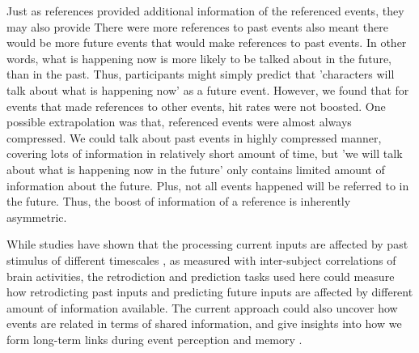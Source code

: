 Just as references provided additional information of the referenced events, they may also provide 
There were more references to past events also meant there would be more future events that would make references to past events. In other words, what is happening now is more likely to be talked about in the future, than in the past. Thus, participants might simply predict that 'characters will talk about what is happening now' as a future event. However, we found that for events that made references to other events, hit rates were not boosted. One possible extrapolation was that, referenced events were almost always compressed. We could talk about past events in highly compressed manner, covering lots of information in relatively short amount of time, but 'we will talk about what is happening now in the future' only contains limited amount of information about the future. Plus, not all events happened will be referred to in the future. Thus, the boost of information of a reference is inherently asymmetric.

While studies have shown that the processing current inputs are affected by past stimulus of different timescales \citep{HassEtal15, LernEtal11}, as measured with inter-subject correlations of brain activities, the retrodiction and prediction tasks used here could measure how retrodicting past inputs and predicting future inputs are affected by different amount of information available. The current approach could also uncover how events are related in terms of shared information, and give insights into how we form long-term links during event perception and memory \citep{HeusEtal21, Mann21a, ChanEtal21b, CohnEtal21}.